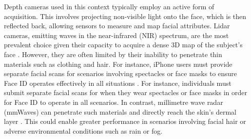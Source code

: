 \documentclass{mpaper}
\begin{document}
Depth cameras used in this context typically employ an active form of acquisition. This involves projecting non-visible light onto the face, which is then reflected back, allowing sensors to measure and map facial attributes. Lidar cameras, emitting waves in the near-infrared (NIR) spectrum, are the most prevalent choice given their capacity to acquire a dense 3D map of the subject's face \cite{wang2020evolution}. However, they are often limited by their inability to penetrate thin materials such as clothing and hair. For instance, iPhone users must provide separate facial scans for scenarios involving spectacles or face masks to ensure Face ID operates effectively in all situations \cite{apple-faceid-mask}. For instance, individuals must submit separate facial scans for when they wear spectacles or face masks in order for Face ID to operate in all scenarios. In contrast, millimetre wave radar (mmWaves) can penetrate such materials and directly reach the skin's dermal layer \cite{vizard2006advances}. This could enable greater performance in scenarios involving facial hair or adverse environmental conditions such as rain or fog.
\end{document}
